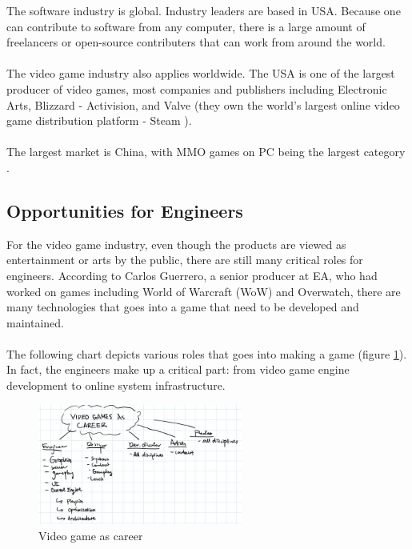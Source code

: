 \documentclass[10pt,letterpaper]{article}
\begin{document}
The software industry is global. Industry leaders are based in USA. Because one can contribute to software from any computer, there is a large amount of freelancers or open-source contributers that can work from around the world.\\
\\
The video game industry also applies worldwide. The USA is one of the largest producer of video games, most companies and publishers including Electronic Arts, Blizzard - Activision, and Valve (they own the world's largest online video game distribution platform - Steam \cite{steam}).\\
\\
The largest market is China, with MMO games on PC being the largest category \cite{video-game-china, big-game-china}.

\subsection{Opportunities for Engineers}

For the video game industry, even though the products are viewed as entertainment or arts by the public, there are still many critical roles for engineers. According to Carlos Guerrero, a senior producer at EA, who had worked on games including World of Warcraft (WoW) and Overwatch, there are many technologies that goes into a game that need to be developed and maintained.\cite{intern-speaker}\\
\\
The following chart depicts various roles that goes into making a game (figure \ref{fig:video-game-as-career}). In fact, the engineers make up a critical part: from video game engine development to online system infrastructure.\\

\begin{figure}[H]
	\centering
	\includegraphics[width=0.6\textwidth]{assets/video-games-career-roles}
	\caption{Video game as career\cite{intern-speaker}}
	\label{fig:video-game-as-career}
\end{figure}
\end{document}
